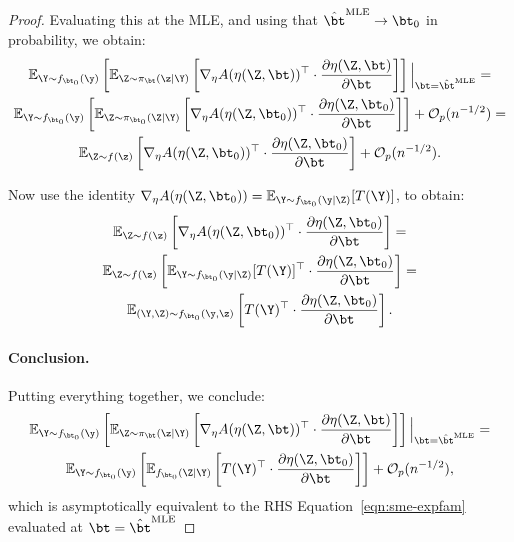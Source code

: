 \begin{proof}
Evaluating this at the MLE, and using that \( \hat\bt^{\text{MLE}} \to \bt_0 \) in probability, we obtain:
\begin{multline}
\label{eqn:rhs-eval-at-mle}
\mathbb{E}_{\Y \sim f_{\bt_0}(\y)} 
\left[
\mathbb{E}_{\Z \sim \pi_\bt(\z \mid \Y)} 
\left[
\nabla_\eta A(\eta(\Z, \bt))^\top 
\cdot 
\frac{\partial \eta(\Z, \bt)}{\partial \bt}
\right]
\right] \Big|_{\bt = \hat\bt^{\text{MLE}}}
=\\
\mathbb{E}_{\Y \sim f_{\bt_0}(\y)} 
\left[
\mathbb{E}_{\Z \sim \pi_{\bt_0}(\Z \mid \Y)} 
\left[
\nabla_\eta A(\eta(\Z, \bt_0))^\top 
\cdot 
\frac{\partial \eta(\Z, \bt_0)}{\partial \bt}
\right]
\right]
+ \mathcal{O}_p(n^{-1/2})
=\\
\mathbb{E}_{\Z \sim f(\z)} 
\left[
\nabla_\eta A(\eta(\Z, \bt_0))^\top 
\cdot 
\frac{\partial \eta(\Z, \bt_0)}{\partial \bt}
\right]
+ \mathcal{O}_p(n^{-1/2}).
\end{multline}

Now use the identity \( \nabla_\eta A(\eta(\Z, \bt_0)) = \mathbb{E}_{\Y \sim f_{\bt_0}(\y \mid \Z)}[T(\Y)] \), to obtain:
\begin{multline}
\mathbb{E}_{\Z \sim f(\z)} 
\left[
\nabla_\eta A(\eta(\Z, \bt_0))^\top 
\cdot 
\frac{\partial \eta(\Z, \bt_0)}{\partial \bt}
\right]
=\\
\mathbb{E}_{\Z \sim f(\z)} 
\left[
\mathbb{E}_{\Y \sim f_{\bt_0}(\y \mid \Z)}[T(\Y)]^\top 
\cdot 
\frac{\partial \eta(\Z, \bt_0)}{\partial \bt}
\right]
=\\
\mathbb{E}_{(\Y, \Z) \sim f_{\bt_0}(\y, \z)} 
\left[
T(\Y)^\top 
\cdot 
\frac{\partial \eta(\Z, \bt_0)}{\partial \bt}
\right].
\end{multline}

\paragraph{Conclusion.} Putting everything together, we conclude:
\begin{multline}
\mathbb{E}_{\Y \sim f_{\bt_0}(\y)} 
\left[
\mathbb{E}_{\Z\sim \pi_\bt(\z \mid \Y)} 
\left[
\nabla_\eta A(\eta(\Z, \bt))^\top 
\cdot 
\frac{\partial \eta(\Z, \bt)}{\partial \bt}
\right]
\right] \Big|_{\bt = \hat\bt^{\text{MLE}}}
=\\
\mathbb{E}_{\Y \sim f_{\bt_0}(\y)} 
\left[
\mathbb{E}_{f_{\bt_0}(\Z \mid \Y)} 
\left[
T(\Y)^\top 
\cdot 
\frac{\partial \eta(\Z, \bt_0)}{\partial \bt}
\right]
\right]
+ \mathcal{O}_p(n^{-1/2}),
\end{multline}
which is asymptotically equivalent to the RHS Equation~\eqref{eqn:sme-expfam} evaluated at $\bt = \hat\bt^{\text{MLE}}$



\end{proof}
